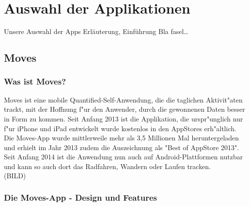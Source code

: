 
\chapter{Auswahl der Applikationen}
\label{ch:Apps}
Unsere Auswahl der Apps
Erläuterung, Einführung
Bla fasel\ldots



\section{Moves}
\label{ch:Apps:sec:Moves}

\subsection{Was ist Moves?}
\label{ch:Apps:sec:Moves:subsec:WIM}

Moves ist eine mobile Quantified-Self-Anwendung, die die taglichen Aktivit"aten trackt, mit der Hoffnung f"ur den Anwender, durch die gewonnenen Daten besser in Form zu kommen. 
Seit Anfang 2013 ist die Applikation, die urspr"unglich nur f"ur iPhone und iPad entwickelt wurde kostenlos in den AppStores erh"altlich. 
Die Moves-App wurde mittlerweile mehr als 3,5 Millionen Mal heruntergeladen und erhielt im Jahr 2013 zudem die Auszeichnung als "Best of AppStore 2013".
Seit Anfang 2014 ist die Anwendung nun auch auf Android-Plattformen nutzbar und kann so auch dort das Radfahren, Wandern oder Laufen tracken.
\\
(BILD)

\subsection{Die Moves-App - Design und Features}
\label{ch:Apps:sec:Moves:subsec:DuF}

